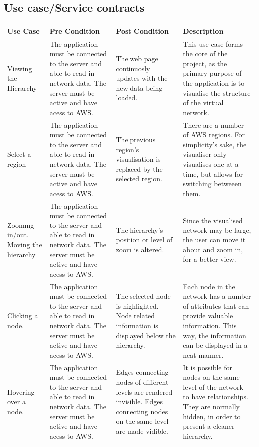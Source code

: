 \documentclass[hidelinks,a4paper,12pt]{article}
\begin{document}
		\subsection{Use case/Service contracts}
		\begin{tabular}{ | p{3cm} | p{4cm} | p{4cm} | p{4cm} |}
			\hline
			Use Case & Pre Condition & Post Condition & Description \\ \hline
			
			Viewing the Hierarchy & The application must be connected to the server and able to read in network data. The server must be active and have acess to AWS.& The web page continuosly updates with the new data being loaded. & This use case forms the core of the project, as the primary purpose of the application is to visualise the structure of the virtual network.\\ \hline
			
			Select a region 	& The application must be connected to the server and able to read in network data. The server must be active and have acess to AWS.& The previous region's visualisation is replaced by the selected region. & There are a number of AWS regions. For simplicity's sake, the visualiser only visualises one at a time, but allows for switching betweeen them.\\ \hline
			
			Zooming in/out. Moving the hierarchy	& The application must be connected to the server and able to read in network data. The server must be active and have acess to AWS.& The hierarchy's position or level of zoom is altered. & Since the visualised network may be large, the user can move it about and zoom in, for a better view.\\ \hline
			
			Clicking a node.& The application must be connected to the server and able to read in network data. The server must be active and have acess to AWS.& The selected node is highlighted. Node related information is displayed below the hierarchy. & Each node in the network has a number of attributes that can provide valuable information. This way, the information can be displayed in a neat manner.\\ \hline
			
			Hovering over a node.& The application must be connected to the server and able to read in network data. The server must be active and have acess to AWS.& Edges connecting nodes of different levels are rendered invisible. Edges connecting nodes on the same level are made vidible. & It is possible for nodes on the same level of the network to have relationships. They are normally hidden, in order to present a cleaner hierarchy. \\ \hline
		\end{tabular}
		
\end{document}
